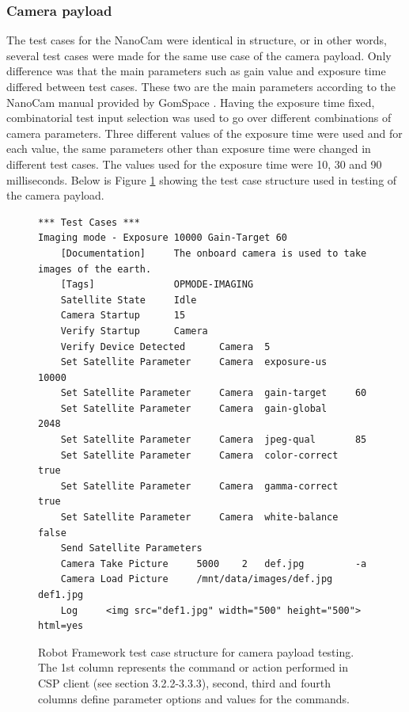 \documentclass[english,12pt,a4paper,pdftex,elec,utf8]{aaltothesis}
\begin{document}
\subsubsection{Camera payload}
The test cases for the NanoCam were identical in structure, or in other words, several test cases were made for the same use case of the camera payload. Only difference was that the main parameters such as gain value and exposure time differed between test cases. These two are the main parameters according to the NanoCam manual provided by GomSpace \cite{nanocamds}. Having the exposure time fixed, combinatorial test input selection was used to go over different combinations of camera parameters. Three different values of the exposure time were used and for each value, the same parameters other than exposure time were changed in different test cases. The values used for the exposure time were 10, 30 and 90 milliseconds.  Below is Figure \ref{robotcamera} showing the test case structure used in testing of the camera payload.\par
\begin{figure}[h!]
\centering
\begin{verbatim}
*** Test Cases ***
Imaging mode - Exposure 10000 Gain-Target 60
	[Documentation]		The onboard camera is used to take images of the earth.
	[Tags]				OPMODE-IMAGING
	Satellite State		Idle
	Camera Startup		15
	Verify Startup		Camera
	Verify Device Detected		Camera 	5
	Set Satellite Parameter		Camera	exposure-us		10000
	Set Satellite Parameter		Camera	gain-target		60
	Set Satellite Parameter		Camera	gain-global		2048
	Set Satellite Parameter		Camera	jpeg-qual		85
	Set Satellite Parameter		Camera	color-correct	true
	Set Satellite Parameter		Camera	gamma-correct	true
	Set Satellite Parameter		Camera	white-balance	false
	Send Satellite Parameters
	Camera Take Picture		5000	2	def.jpg 		-a
	Camera Load Picture		/mnt/data/images/def.jpg	def1.jpg
	Log		<img src="def1.jpg" width="500" height="500">	html=yes
\end{verbatim}
\caption{Robot Framework test case structure for camera payload testing. The 1st column represents the command or action performed in CSP client (see section 3.2.2-3.3.3), second, third and fourth columns define parameter options and values for the commands.}
\label{robotcamera}
\end{figure}
\end{document}
